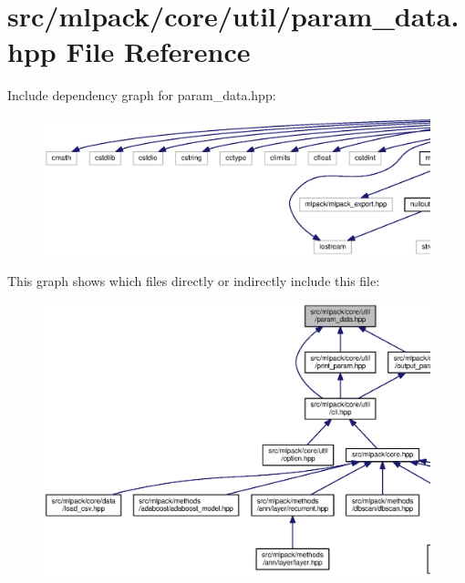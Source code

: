 \section{src/mlpack/core/util/param\+\_\+data.hpp File Reference}
\label{param__data_8hpp}
Include dependency graph for param\+\_\+data.\+hpp\+:
\nopagebreak
\begin{figure}[H]
\begin{center}
\leavevmode
\includegraphics[width=350pt]{param__data_8hpp__incl}
\end{center}
\end{figure}
This graph shows which files directly or indirectly include this file\+:
\nopagebreak
\begin{figure}[H]
\begin{center}
\leavevmode
\includegraphics[width=350pt]{param__data_8hpp__dep__incl}
\end{center}
\end{figure}
